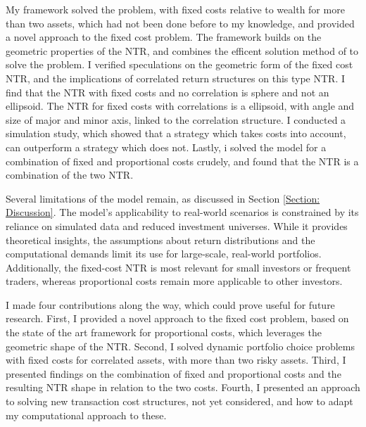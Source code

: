 \documentclass[11pt]{article}
\begin{document}
My framework solved the problem, with fixed costs relative to wealth for more than two assets, which had not been done before to my knowledge,
and provided a novel approach to the fixed cost problem.
The framework builds on the geometric properties of the \ac{NTR}, and combines the efficent solution method of \autocite{Scheidegger2023} to solve the problem.
I verified speculations on the geometric form of the fixed cost \ac{NTR}, and the implications of correlated return structures on this type \ac{NTR}.
I find that the \ac{NTR} with fixed costs and no correlation is sphere and not an ellipsoid. The \ac{NTR} for fixed costs with correlations is a ellipsoid, with angle and size of major and minor axis, linked to the correlation structure.
I conducted a simulation study, which showed that a strategy which takes costs into account, can outperform a strategy which does not.
Lastly, i solved the model for a combination of fixed and proportional costs crudely, and found that the \ac{NTR} is a combination of the two \ac{NTR}.

Several limitations of the model remain, as discussed in Section \ref{Section: Discussion}.
The model’s applicability to real-world scenarios is constrained by its reliance on simulated data and reduced investment universes.
While it provides theoretical insights, the assumptions about return distributions and the computational demands limit its use for large-scale, real-world portfolios.
Additionally, the fixed-cost \ac{NTR} is most relevant for small investors or frequent traders, whereas proportional costs remain more applicable to other investors. 

I made four contributions along the way, which could prove useful for future research.
First, I provided a novel approach to the fixed cost problem, based on the state of the art framework for proportional costs, which leverages the geometric shape of the \ac{NTR}.
Second, I solved dynamic portfolio choice problems with fixed costs for correlated assets, with more than two risky assets.
Third, I presented findings on the combination of fixed and proportional costs and the resulting \ac{NTR} shape in relation to the two costs.
Fourth, I presented an approach to solving new transaction cost structures, not yet considered, and how to adapt my computational approach to these.


\ifdefined\COMPILINGMAIN
\else
\end{document}

